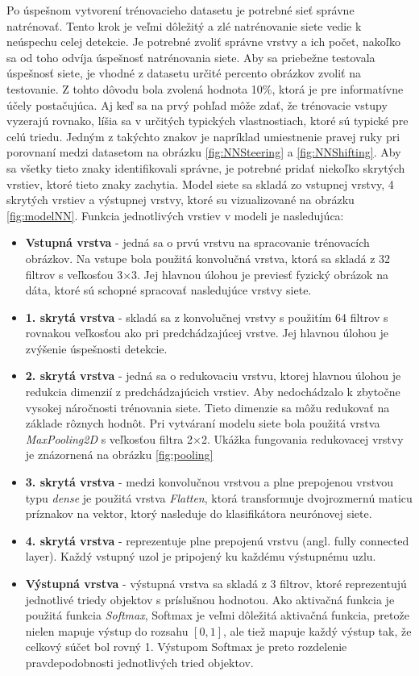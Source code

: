 \documentclass[slovak,master,dept460,male,cpp,cpdeclaration]{diploma}
\begin{document}
\newpage
Po úspešnom vytvorení trénovacieho datasetu je potrebné  sieť správne natrénovať. Tento krok je  veľmi dôležitý a zlé natrénovanie siete vedie k  neúspechu celej detekcie. Je potrebné zvoliť správne vrstvy a ich počet, nakoľko sa  od toho odvíja úspešnosť natrénovania siete. Aby sa priebežne testovala úspešnosť siete, je vhodné  z datasetu určité percento  obrázkov zvoliť na testovanie. Z tohto dôvodu bola zvolená hodnota 10\%, ktorá je pre informatívne účely postačujúca. Aj keď sa na prvý pohľad môže zdať, že trénovacie vstupy vyzerajú rovnako, líšia sa v určitých typických vlastnostiach, ktoré sú typické pre celú triedu. Jedným z takýchto znakov je napríklad umiestnenie pravej ruky pri porovnaní  medzi datasetom na obrázku \ref{fig:NNSteering} a \ref{fig:NNShifting}. Aby sa všetky tieto znaky identifikovali správne, je potrebné pridať niekoľko skrytých vrstiev, ktoré tieto znaky zachytia. Model siete sa skladá zo vstupnej vrstvy, 4 skrytých vrstiev a výstupnej vrstvy, ktoré su vizualizované na obrázku \ref{fig:modelNN}. Funkcia jednotlivých vrstiev v modeli je nasledujúca:
\begin{itemize}
\item \textbf{Vstupná vrstva} - jedná sa o prvú vrstvu na spracovanie trénovacích obrázkov. Na vstupe bola použitá konvolučná vrstva, ktorá sa skladá z 32 filtrov s veľkosťou 3$\times$3. Jej hlavnou úlohou je previesť fyzický obrázok na dáta, ktoré sú schopné spracovať nasledujúce vrstvy siete.
\item \textbf{1. skrytá vrstva}  - skladá sa z konvolučnej vrstvy s použitím 64 filtrov s rovnakou veľkosťou ako pri predchádzajúcej vrstve. Jej hlavnou úlohou je zvýšenie úspešnosti detekcie.
\item \textbf{2. skrytá vrstva} -  jedná sa o redukovaciu vrstvu, ktorej hlavnou úlohou je redukcia dimenzií z predchádzajúcich vrstiev. Aby nedochádzalo k zbytočne vysokej náročnosti trénovania siete. Tieto dimenzie sa môžu redukovať na základe  rôznych hodnôt. Pri vytváraní modelu siete bola použitá vrstva \textit{MaxPooling2D} s veľkosťou filtra 2$\times$2. Ukážka fungovania redukovacej vrstvy je znázornená na obrázku \ref{fig:pooling}
\item \textbf{3. skrytá vrstva} - medzi konvolučnou vrstvou a plne prepojenou vrstvou typu \textit{dense} je  použitá vrstva \textit{Flatten}, ktorá transformuje dvojrozmernú maticu príznakov na vektor, ktorý nasleduje do klasifikátora neurónovej siete. 
\item \textbf{4. skrytá vrstva} - reprezentuje plne prepojenú vrstvu  (angl. fully connected layer). Každý vstupný uzol je pripojený ku každému výstupnému uzlu.
\item \textbf{Výstupná vrstva} - výstupná vrstva sa skladá z 3 filtrov, ktoré reprezentujú jednotlivé triedy objektov s príslušnou hodnotou. Ako aktivačná funkcia je použitá funkcia \textit{Softmax}, Softmax je veľmi dôležitá aktivačná funkcia, pretože nielen mapuje  výstup do rozsahu $[0,1]$, ale tiež mapuje každý výstup tak, že celkový súčet bol rovný 1. Výstupom Softmax je preto rozdelenie pravdepodobnosti jednotlivých tried objektov.
\end{itemize}
\end{document}
